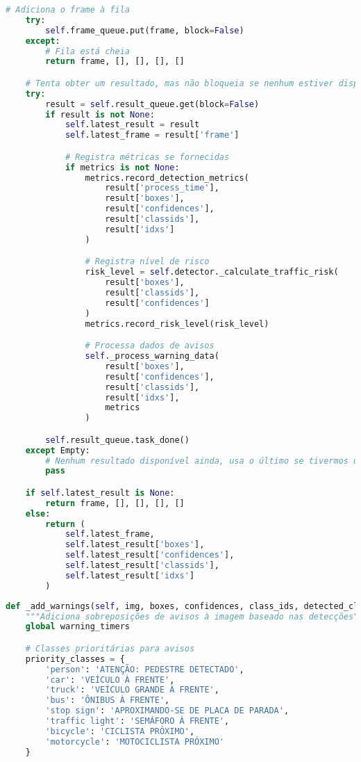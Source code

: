 \documentclass[
	12pt,				%
	oneside, %
	a4paper,			%
	english,			%
	french,				%
	spanish,			%
	brazil				%
	]{abntex2}
\begin{document}
\begin{apendicesenv}
\begin{lstlisting}[language=Python, caption=Controle adaptativo de taxa de processamento., label=lst:adaptive_rate_control]
    # Adiciona o frame à fila
    try:
        self.frame_queue.put(frame, block=False)
    except:
        # Fila está cheia
        return frame, [], [], [], []

    # Tenta obter um resultado, mas não bloqueia se nenhum estiver disponível
    try:
        result = self.result_queue.get(block=False)
        if result is not None:
            self.latest_result = result
            self.latest_frame = result['frame']

            # Registra métricas se fornecidas
            if metrics is not None:
                metrics.record_detection_metrics(
                    result['process_time'],
                    result['boxes'],
                    result['confidences'],
                    result['classids'],
                    result['idxs']
                )

                # Registra nível de risco
                risk_level = self.detector._calculate_traffic_risk(
                    result['boxes'],
                    result['classids'],
                    result['confidences']
                )
                metrics.record_risk_level(risk_level)

                # Processa dados de avisos
                self._process_warning_data(
                    result['boxes'],
                    result['confidences'],
                    result['classids'],
                    result['idxs'],
                    metrics
                )

        self.result_queue.task_done()
    except Empty:
        # Nenhum resultado disponível ainda, usa o último se tivermos um
        pass

    if self.latest_result is None:
        return frame, [], [], [], []
    else:
        return (
            self.latest_frame,
            self.latest_result['boxes'],
            self.latest_result['confidences'],
            self.latest_result['classids'],
            self.latest_result['idxs']
        )
\end{lstlisting}

\begin{lstlisting}[language=Python, caption=Implementação do sistema de \textit{feedback} visual., label=lst:add_warnings]
def _add_warnings(self, img, boxes, confidences, class_ids, detected_classes):
    """Adiciona sobreposições de avisos à imagem baseado nas detecções"""
    global warning_timers

    # Classes prioritárias para avisos
    priority_classes = {
        'person': 'ATENÇÃO: PEDESTRE DETECTADO',
        'car': 'VEÍCULO À FRENTE',
        'truck': 'VEÍCULO GRANDE À FRENTE',
        'bus': 'ÔNIBUS À FRENTE',
        'stop sign': 'APROXIMANDO-SE DE PLACA DE PARADA',
        'traffic light': 'SEMÁFORO À FRENTE',
        'bicycle': 'CICLISTA PRÓXIMO',
        'motorcycle': 'MOTOCICLISTA PRÓXIMO'
    }


\end{lstlisting}
\end{apendicesenv}
\end{document}

